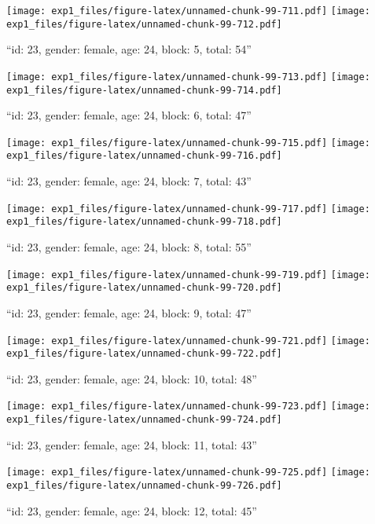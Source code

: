 \documentclass[,]{article}
\begin{document}
\texttt{[image: exp1\_files/figure-latex/unnamed-chunk-99-711.pdf]}
\texttt{[image: exp1\_files/figure-latex/unnamed-chunk-99-712.pdf]}

\newpage
[1] 

``id: 23, gender: female, age: 24, block: 5, total: 54''

\texttt{[image: exp1\_files/figure-latex/unnamed-chunk-99-713.pdf]}
\texttt{[image: exp1\_files/figure-latex/unnamed-chunk-99-714.pdf]}

\newpage
[1] 

``id: 23, gender: female, age: 24, block: 6, total: 47''

\texttt{[image: exp1\_files/figure-latex/unnamed-chunk-99-715.pdf]}
\texttt{[image: exp1\_files/figure-latex/unnamed-chunk-99-716.pdf]}

\newpage
[1] 

``id: 23, gender: female, age: 24, block: 7, total: 43''

\texttt{[image: exp1\_files/figure-latex/unnamed-chunk-99-717.pdf]}
\texttt{[image: exp1\_files/figure-latex/unnamed-chunk-99-718.pdf]}

\newpage
[1] 

``id: 23, gender: female, age: 24, block: 8, total: 55''

\texttt{[image: exp1\_files/figure-latex/unnamed-chunk-99-719.pdf]}
\texttt{[image: exp1\_files/figure-latex/unnamed-chunk-99-720.pdf]}

\newpage
[1] 

``id: 23, gender: female, age: 24, block: 9, total: 47''

\texttt{[image: exp1\_files/figure-latex/unnamed-chunk-99-721.pdf]}
\texttt{[image: exp1\_files/figure-latex/unnamed-chunk-99-722.pdf]}

\newpage
[1] 

``id: 23, gender: female, age: 24, block: 10, total: 48''

\texttt{[image: exp1\_files/figure-latex/unnamed-chunk-99-723.pdf]}
\texttt{[image: exp1\_files/figure-latex/unnamed-chunk-99-724.pdf]}

\newpage
[1] 

``id: 23, gender: female, age: 24, block: 11, total: 43''

\texttt{[image: exp1\_files/figure-latex/unnamed-chunk-99-725.pdf]}
\texttt{[image: exp1\_files/figure-latex/unnamed-chunk-99-726.pdf]}

\newpage
[1] 

``id: 23, gender: female, age: 24, block: 12, total: 45''
\end{document}
